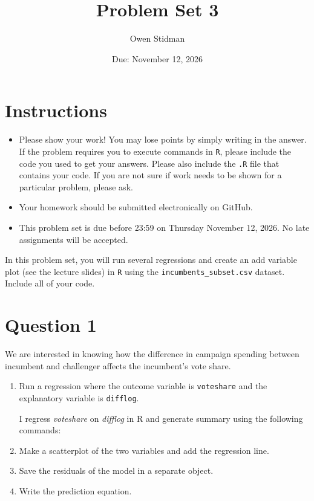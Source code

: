 \documentclass[12pt,letterpaper]{article}
\title{Problem Set 3}
\date{Due: November 12, 2026}
\author{Owen Stidman}
\begin{document}
	\maketitle
	\section*{Instructions}
	\begin{itemize}
		\item Please show your work! You may lose points by simply writing in the answer. If the problem requires you to execute commands in \texttt{R}, please include the code you used to get your answers. Please also include the \texttt{.R} file that contains your code. If you are not sure if work needs to be shown for a particular problem, please ask.
	\item Your homework should be submitted electronically on GitHub.
	\item This problem set is due before 23:59 on Thursday November 12, 2026. No late assignments will be accepted.

	\end{itemize}

		\vspace{.25cm}
	
\noindent In this problem set, you will run several regressions and create an add variable plot (see the lecture slides) in \texttt{R} using the \texttt{incumbents\_subset.csv} dataset. Include all of your code.

	\vspace{.5cm}
\section*{Question 1}
\vspace{.25cm}
\noindent We are interested in knowing how the difference in campaign spending between incumbent and challenger affects the incumbent's vote share. 
	\begin{enumerate}
		\item Run a regression where the outcome variable is \texttt{voteshare} and the explanatory variable is \texttt{difflog}.	\vspace{5cm}
		
		I regress \textit{voteshare} on \textit{difflog} in R and generate summary using the following commands:
			 
		
		\item Make a scatterplot of the two variables and add the regression line. 	\vspace{7cm}
		\item Save the residuals of the model in a separate object.	\vspace{7cm}
		\item Write the prediction equation.
	\end{enumerate}
	
\end{document}
